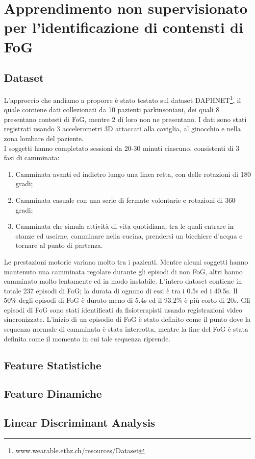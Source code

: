 

\chapter[Apprendimento non supervisionato]{Apprendimento non supervisionato per l'identificazione di contensti di FoG}\label{chap5:Automatic}
\section{Dataset}
L'approccio che andiamo a proporre è stato testato sul dataset DAPHNET\footnote{www.wearable.ethz.ch/resources/Dataset}, il quale contiene dati collezionati da 10 pazienti parkinsoniani, dei quali 8 presentano contesti di FoG, mentre 2 di loro non ne presentano. I dati sono stati registrati usando 3 accelerometri 3D attaccati alla caviglia, al ginocchio e nella zona lombare del paziente.\\
I soggetti hanno completato sessioni da 20-30 minuti ciascuno, consistenti di 3 fasi di camminata:
\begin{enumerate}
	\item Camminata avanti ed indietro lungo una linea retta, con delle rotazioni di 180 gradi;
	\item Camminata casuale con una serie di fermate volontarie e rotazioni di 360 gradi;
	\item Camminata che simula attività di vita quotidiana, tra le quali entrare in stanze ed uscirne, camminare nella cucina, prendersi un bicchiere d'acqua e tornare al punto di partenza.
\end{enumerate}
Le prestazioni motorie variano molto tra i pazienti. Mentre alcuni soggetti hanno mantenuto una camminata regolare durante gli episodi di non FoG, altri hanno camminato molto lentamente ed in modo instabile. L'intero dataset contiene in totale 237 episodi di FoG; la durata di ognuno di essi è tra i 0.5s ed i 40.5s. Il 50\% degli episodi di FoG è durato meno di 5.4s ed il 93.2\% è più corto di 20s. Gli episodi di FoG sono stati identificati da fisioterapisti usando registrazioni video sincronizzate. L'inizio di un episodio di FoG è stato definito come il punto dove la sequenza normale di camminata è stata interrotta, mentre la fine del FoG è stata definita come il momento in cui tale sequenza riprende.
\section{Feature Statistiche}


\section{Feature Dinamiche}


\section{Linear Discriminant Analysis}
